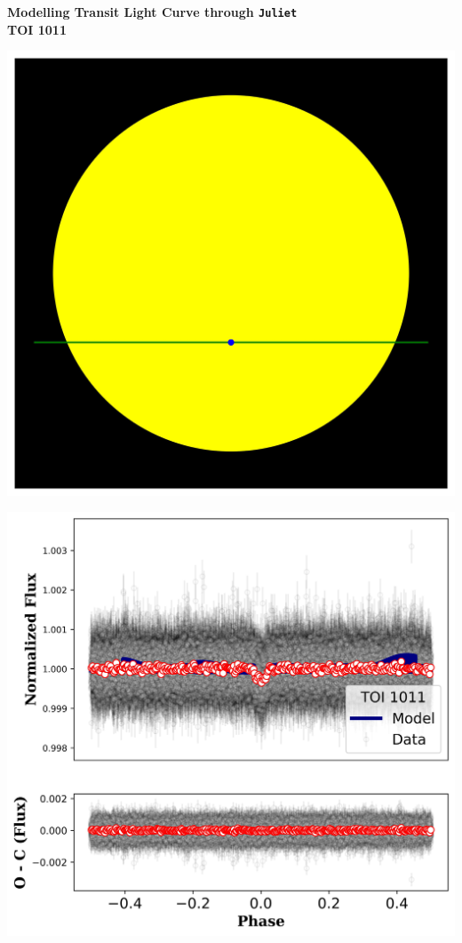 \documentclass[12pt, a4paper]{book}
\begin{document}
 
\begin{center}
{\Huge \textbf{Modelling Transit Light Curve through \texttt{Juliet}}}\\
\vspace*{1cm}
{\Huge \textbf{ TOI 1011 }}
\end{center}
 
\vspace*{0.6cm}
 
\begin{center}
\includegraphics[scale=0.5]{TOI_1011_Visuals}
\end{center}
 
\vspace*{0.6cm}
 
\begin{center}
\includegraphics[scale=0.6]{TOI_1011_Transit}
\end{center}
 
\end{document}
